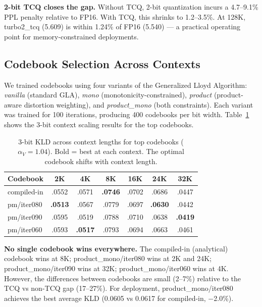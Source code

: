 \documentclass{article}
\begin{document}
\textbf{2-bit TCQ closes the gap.} Without TCQ, 2-bit quantization incurs
a 4.7--9.1\% PPL penalty relative to FP16. With TCQ, this shrinks to
1.2--3.5\%. At 128K, turbo2\_tcq (5.609) is within 1.24\% of FP16 (5.540) ---
a practical operating point for memory-constrained deployments.

\subsection{Codebook Selection Across Contexts}
\label{sec:codebook_context_results}

We trained codebooks using four variants of the Generalized Lloyd Algorithm:
\emph{vanilla} (standard GLA), \emph{mono} (monotonicity-constrained),
\emph{product} (product-aware distortion weighting), and \emph{product\_mono}
(both constraints). Each variant was trained for 100 iterations, producing 400
codebooks per bit width. Table~\ref{tab:codebook_3bit} shows the 3-bit context
scaling results for the top codebooks.

\begin{table}[t]
\centering
\caption{3-bit KLD across context lengths for top codebooks ($\alpha_V = 1.04$).
Bold = best at each context. The optimal codebook shifts with context length.}
\label{tab:codebook_3bit}
\begin{tabular}{@{}lcccccc@{}}
\toprule
Codebook & 2K & 4K & 8K & 16K & 24K & 32K \\
\midrule
compiled-in         & .0552 & .0571 & \textbf{.0746} & .0702 & .0686 & .0447 \\
pm/iter080          & \textbf{.0513} & .0567 & .0779 & .0697 & \textbf{.0630} & .0442 \\
pm/iter090          & .0595 & .0519 & .0788 & .0710 & .0638 & \textbf{.0419} \\
pm/iter060          & .0593 & \textbf{.0517} & .0793 & .0694 & .0663 & .0461 \\
\bottomrule
\end{tabular}
\end{table}

\textbf{No single codebook wins everywhere.} The compiled-in (analytical)
codebook wins at 8K; product\_mono/iter080 wins at 2K and 24K;
product\_mono/iter090 wins at 32K; product\_mono/iter060 wins at 4K. However,
the differences between codebooks are small (2--7\%) relative to the TCQ
vs non-TCQ gap (17--27\%). For deployment, product\_mono/iter080 achieves the
best average KLD (0.0605 vs 0.0617 for compiled-in, $-$2.0\%).
\end{document}
